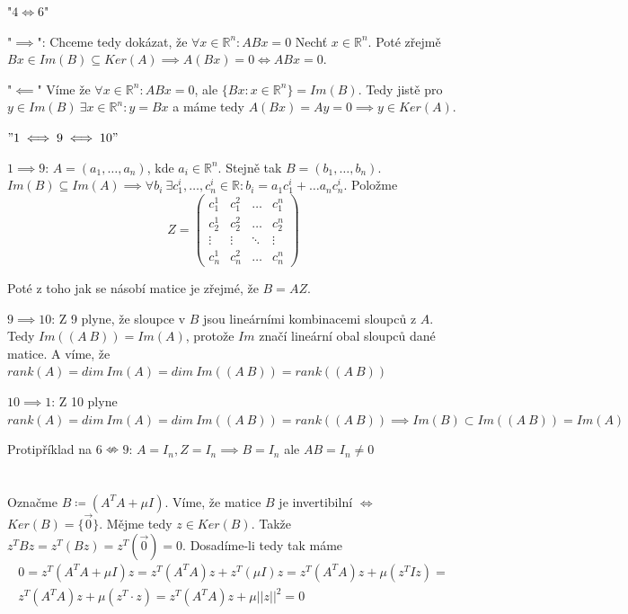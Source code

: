 \documentclass[12pt, a4paper]{article}
\begin{document}
"$4 \iff 6$"

"$\implies$": Chceme tedy dokázat, že $\forall x \in \mathbb{R}^n: ABx=0$ Nechť $x \in \mathbb{R}^n$. Poté zřejmě $Bx \in Im(B) \subseteq Ker(A) \implies A(Bx)=0 \iff ABx=0$.

"$\impliedby$" Víme že $\forall x \in \mathbb{R}^n: ABx=0$, ale $\{Bx : x \in \mathbb{R}^n\}=Im(B)$. Tedy jistě pro $y \in Im(B) \ \exists x \in \mathbb{R}^n: y=Bx$ a máme tedy $A(Bx)=Ay=0 \implies y \in Ker(A)$.


$"1 \iff 9 \iff 10"$

$1 \implies 9$: $A = (a_1, \dots, a_n)$, kde $a_i \in \mathbb{R}^n$. Stejně tak $B = (b_1, \dots, b_n)$.  $Im(B) \subseteq Im(A) \implies \forall b_i \ \exists c^i_1, \dots, c^i_n \in \mathbb{R}: b_i = a_1 c^i_1 + \dots a_n c^i_n$. Položme
\[
Z = \begin{pmatrix}
c^1_1 & c^2_1 & \dots & c^n_1 \\
c^1_2 & c^2_2 & \dots & c^n_2 \\
\vdots & \vdots & \ddots & \vdots \\
c^1_n & c^2_n & \dots & c^n_n
\end{pmatrix}
\]

Poté z toho jak se násobí matice je zřejmé, že $B = AZ$.

$9 \implies 10$: Z 9 plyne, že sloupce v $B$ jsou lineárními kombinacemi sloupců z $A$. Tedy $Im((A \ B))=Im(A)$, protože $Im$ značí lineární obal sloupců dané matice. A víme, že $rank(A) = dim \ Im(A) = dim \ Im((A \ B)) = rank((A \ B))$

$10 \implies 1$: Z 10 plyne $rank(A) = dim \ Im(A) = dim \ Im((A \ B)) = rank((A \ B)) \implies Im(B) \subset Im((A \ B))=Im(A) $

Protipříklad na $6 \nLeftrightarrow 9$: $A = I_n, Z=I_n \implies B=I_n$ ale $AB=I_n \neq 0$

\section{}
\subsection{}
Označme $B \coloneqq (A^T A+ \mu I)$. Víme, že matice $B$ je invertibilní $\iff$ $Ker(B)=\{\vec{0}\}$. Mějme tedy $z \in Ker(B)$. Takže $z^T B z = z^T(Bz)= z^T(\vec{0})=0$. Dosadíme-li tedy tak máme
\begin{gather*}
0=z^T(A^T A+ \mu I)z=z^T(A^T A)z + z^T(\mu I)z = z^T(A^T A)z + \mu (z^T I z) =\\
z^T(A^T A)z + \mu (z^T \cdot z)=z^T(A^T A)z + \mu||z||^2=0
\end{gather*}
\end{document}
